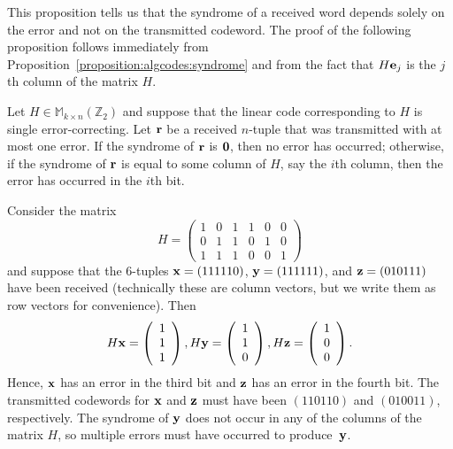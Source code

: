  
This proposition tells us that the syndrome of a received word depends
solely on the error and not on the transmitted codeword. The proof of the
following proposition follows immediately from Proposition~\ref{proposition:algcodes:syndrome} and from
the fact that $H{\bold e}_j$ is the $j$th column of the matrix $H$.
 
 \begin{prop}{}
Let $H \in \mathbb{M}_{ k \times n} ( \mathbb{Z}_2)$ and suppose that the
linear code corresponding to $H$ is single error-correcting. Let
${\bold r}$ be a received $n$-tuple that was transmitted with at most
one error. If the syndrome of ${\bold r}$ is ${\bold 0}$, then no
error has occurred; otherwise, if the syndrome of ${\bold r}$ is equal
to some column of $H$, say the $i$th column, then the error has
occurred in the $i$th bit.  
\end{prop}
 
 \begin{example}{}
Consider the matrix
\[
H =
\left(
\begin{array}{cccccc}
1 & 0 & 1 & 1 & 0 & 0 \\
0 & 1 & 1 & 0 & 1 & 0 \\
1 & 1 & 1 & 0 & 0 & 1
\end{array}
\right)
\]
and suppose that the  6-tuples ${\bold x} = (111110)$,
${\bold y} = (111111)$, and ${\bold z} = (010111)$
have been received (technically these are column vectors, but we write them as row vectors for convenience). Then  
\[
H{\bold x} =
\left(
\begin{array}{c} 1 \\ 1 \\ 1 \end{array}
\right),
H{\bold y} =
\left(
\begin{array}{c} 1 \\ 1 \\ 0 \end{array}
\right),
H{\bold z} =
\left(
\begin{array}{c} 1 \\ 0 \\ 0 \end{array}
\right).
\]
Hence, ${\bold x}$ has an error in the third bit and ${\bold z}$ has
an error in the fourth bit. The transmitted codewords for ${\bold x}$
and ${\bold z}$ must have been $(110110)$ and $(010011)$,
respectively. The syndrome of ${\bold y}$ does not occur in any of the
columns of the matrix $H$, so multiple
errors must have occurred to produce~${\bold y}$.
\end{example}
 
